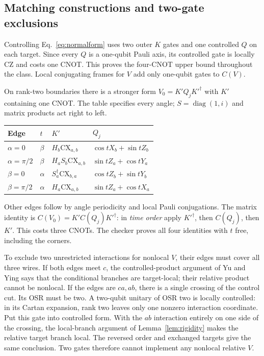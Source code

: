 \documentclass[a4paper,onecolumn,11pt,unpublished]{quantumarticle}
\newcommand{\CNOT}{\mathrm{CX}}
\begin{document}
\subsection{Matching constructions and two-gate exclusions}
Controlling Eq.~\eqref{eq:normalform} uses two outer $K$ gates and one
controlled $Q$ on each target. Since every $Q$ is a one-qubit Pauli axis,
its controlled gate is locally CZ and costs one CNOT. This proves the
four-CNOT upper bound throughout the class. Local conjugating frames for
$V$ add only one-qubit gates to $C(V)$.

On rank-two boundaries there is a stronger form $V_0=K'Q_jK'^\dagger$
with $K'$ containing one CNOT. The table specifies every angle;
$S=\operatorname{diag}(1,i)$ and matrix products act right to left.
\begin{center}\small\begin{tabular}{llll}\toprule
Edge & $t$ & $K'$ & $Q_j$\\\midrule
$\alpha=0$ & $\beta$ & $H_b\CNOT_{a,b}$ & $\cos t X_b+\sin t Z_b$\\
$\alpha=\pi/2$ & $\beta$ & $H_aS_b\CNOT_{a,b}$ & $\sin t Z_a+\cos t Y_a$\\
$\beta=0$ & $\alpha$ & $S_a^\dagger\CNOT_{b,a}$ & $\cos t Z_b+\sin t Y_b$\\
$\beta=\pi/2$ & $\alpha$ & $H_a\CNOT_{a,b}$ & $\sin t Z_a+\cos t X_a$\\
\bottomrule\end{tabular}\end{center}
Other edges follow by angle periodicity and local Pauli conjugations.
The matrix identity is $C(V_0)=K'C(Q_j)K'^\dagger$:
in \emph{time order} apply $K'^\dagger$, then $C(Q_j)$, then $K'$.
This costs three CNOTs.
The checker proves all four identities with $t$ free, including the corners.

To exclude two unrestricted interactions for nonlocal $V$, their edges must
cover all three wires. If both edges meet $c$, the controlled-product
argument of Yu and Ying \cite[Proposition 2]{yuying} says that the
conditional branches are target-local; their relative product cannot be
nonlocal. If the edges are $ca,ab$, there is a single crossing of the
control cut. Its OSR must be two. A two-qubit unitary of OSR two is locally
controlled: in its Cartan expansion, rank two leaves only one nonzero
interaction coordinate. Put this gate into controlled form. With the
$ab$ interaction entirely on one side of the crossing, the local-branch
argument of Lemma~\ref{lem:rigidity} makes the relative target branch local.
The reversed order and exchanged targets give the same conclusion.
Two gates therefore cannot implement any nonlocal relative $V$.
\end{document}
